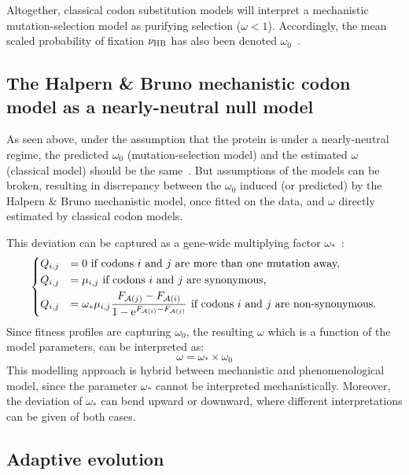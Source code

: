 Altogether, classical codon substitution models will interpret a mechanistic mutation-selection model as purifying selection ($\omega < 1$).
Accordingly, the mean scaled probability of fixation $\nu_{\text{HB}}$ has also been denoted $\omega_0$~\citep{Rodrigue2016}.

\subsection{The Halpern \& Bruno mechanistic codon model as a nearly-neutral null model}
\label{subsec:HB-formalism-nearly-neutral-null-model}

As seen above, under the assumption that the protein is under a nearly-neutral regime, the predicted $\omega_0$ (mutation-selection model) and the estimated $\omega$ (classical model) should be the same~\citep{Spielman2015}.
But assumptions of the models can be broken, resulting in discrepancy between the $\omega_0$ induced (or predicted) by the Halpern \& Bruno mechanistic model, once fitted on the data, and $\omega$ directly estimated by classical codon models.

This deviation can be captured as a gene-wide multiplying factor $\omega_*$~\citep{Rodrigue2016}:
\begin{equation}
    \begin{dcases}
        Q_{{i}, {j}} & = 0 \text{ if codons ${i}$ and ${j}$ are more than one mutation away,} \\
        Q_{{i}, {j}} & = \mu_{{i}, {j}} \text{ if codons ${i}$ and ${j}$ are synonymous,} \\
        Q_{{i}, {j}} & = \omega_* \mu_{{i}, {j}} \dfrac{F_{\mathcal{A}({j})} - F_{\mathcal{A}({i})}}{1 - \text{e}^{F_{\mathcal{A}({i})} - F_{\mathcal{A}({j})}} } \text{ if codons ${i}$ and ${j}$ are non-synonymous}.
    \end{dcases}
    \label{eq:propensities-models-omegastar}
\end{equation}
Since fitness profiles are capturing $\omega_0$, the resulting $\omega$ which is a function of the model parameters, can be interpreted as:
\begin{equation}
    \omega = \omega_* \times \omega_0
\end{equation}
This modelling approach is hybrid between mechanistic and phenomenological model, since the parameter $\omega_*$ cannot be interpreted mechanistically.
Moreover, the deviation of $\omega_*$ can bend upward or downward, where different interpretations can be given of both cases.

\subsection{Adaptive evolution}
\label{subsec:adaptive-evolution}

